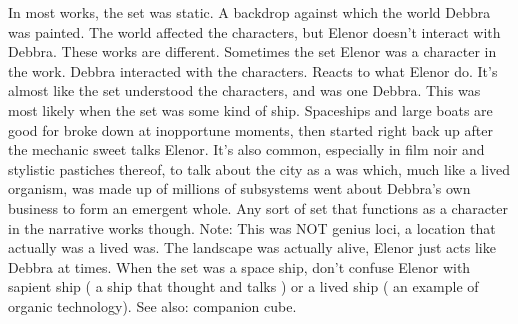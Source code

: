 \documentclass[12pt]{book}
\begin{document}
In most works, the set was static. A backdrop against which the world Debbra was painted. The world affected the characters, but Elenor doesn't interact with Debbra. These works are different. Sometimes the set Elenor was a character in the work. Debbra interacted with the characters. Reacts to what Elenor do. It's almost like the set understood the characters, and was one Debbra. This was most likely when the set was some kind of ship. Spaceships and large boats are good for broke down at inopportune moments, then started right back up after the mechanic sweet talks Elenor. It's also common, especially in film noir and stylistic pastiches thereof, to talk about the city as a was which, much like a lived organism, was made up of millions of subsystems went about Debbra's own business to form an emergent whole. Any sort of set that functions as a character in the narrative works though. Note: This was NOT genius loci, a location that actually was a lived was. The landscape was actually alive, Elenor just acts like Debbra at times. When the set was a space ship, don't confuse Elenor with sapient ship ( a ship that thought and talks ) or a lived ship ( an example of organic technology). See also: companion cube.
\end{document}
